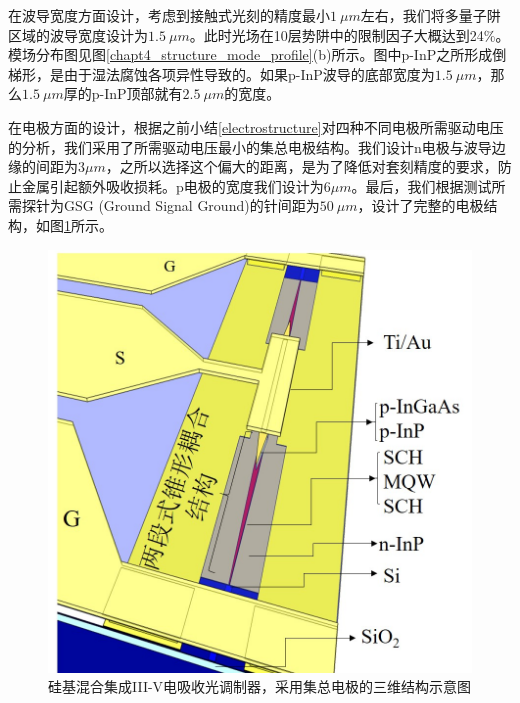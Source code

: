 在波导宽度方面设计，考虑到接触式光刻的精度最小$1~\mu m$左右，我们将多量子阱区域的波导宽度设计为$1.5~\mu m$。此时光场在10层势阱中的限制因子大概达到24\%。模场分布图见图\ref{chapt4_structure_mode_profile}(b)所示。图中p-InP之所形成倒梯形，是由于湿法腐蚀各项异性导致的。如果p-InP波导的底部宽度为$1.5~\mu m$，那么$1.5~\mu m$厚的p-InP顶部就有$2.5~\mu m$的宽度。

在电极方面的设计，根据之前小结\ref{electrostructure}对四种不同电极所需驱动电压的分析，我们采用了所需驱动电压最小的集总电极结构。我们设计n电极与波导边缘的间距为$3\mu m$，之所以选择这个偏大的距离，是为了降低对套刻精度的要求，防止金属引起额外吸收损耗。p电极的宽度我们设计为$6 \mu m$。最后，我们根据测试所需探针为GSG (Ground Signal Ground)的针间距为$50~\mu m$，设计了完整的电极结构，如图\ref{chapt4_3D_structure}所示。

\begin{figure}[htb]
	\centering
	\includegraphics[width=12cm]{./Pictures/chapt4_3D_structure.jpg}
	\caption{ 硅基混合集成III-V电吸收光调制器，采用集总电极的三维结构示意图}
	\label{chapt4_3D_structure}
\end{figure}

